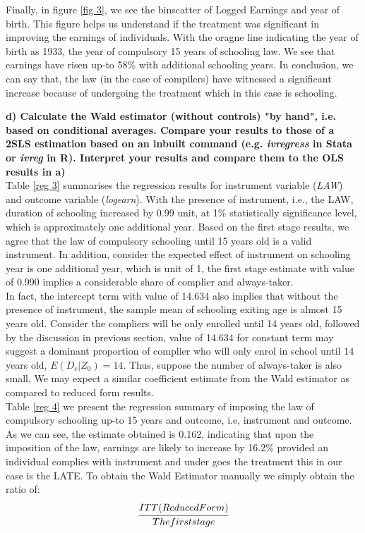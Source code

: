 \documentclass[a4paper,12pt,oneside,English]{article}
\begin{document}
Finally, in figure \ref{fig 3}, we see the binscatter of Logged Earnings and year of birth. This figure helps us understand if the treatment was significant in improving the earnings of individuals. With the oragne line indicating the year of birth as 1933, the year of compulsory 15 years of schooling law. We see that earnings have risen up-to 58\% with additional schooling years. In conclusion, we can say that, the law (in the case of compilers) have witnessed a significant increase because of undergoing the treatment which in this case is schooling.

\newpage
\textbf{d) Calculate the Wald estimator (without controls) "by hand", i.e. based on conditional averages. Compare your results to those of a 2SLS estimation based on an inbuilt command (e.g. \textit{ivregress} in Stata or \textit{ivreg} in R). Interpret your results and compare them to the OLS results in a)}\\

Table \ref{reg 3} summarises the regression results for instrument variable (\textit{LAW}) and outcome variable (\textit{logearn}). With the presence of instrument, i.e., the LAW, duration of schooling increased by 0.99 unit, at 1\% statistically significance level, which is approximately one additional year. Based on the first stage results, we agree that the law of compulsory schooling until 15 years old is a valid instrument. In addition, consider the expected effect of instrument on schooling year is one additional year, which is unit of 1, the first stage estimate with value of 0.990 implies a considerable share of complier and always-taker.\\
In fact, the intercept term with value of 14.634 also implies that without the presence of instrument, the sample mean of schooling exiting age is almost 15 years old. Consider the compliers will be only enrolled until 14 years old, followed by the discussion in previous section, value of 14.634 for constant term may suggest a dominant proportion of complier who will only enrol in school until 14 years old, $E(D_c|Z_0)=14$. Thus, suppose the number of always-taker is also small, We may expect a similar coefficient estimate from the Wald estimator as compared to reduced form results. \\ 

Table \ref{reg 4} we present the regression summary of imposing the law of compulsory schooling up-to 15 years and outcome, i.e, instrument and outcome. As we can see, the estimate obtained is 0.162, indicating that upon the imposition of the law, earnings are likely to increase by 16.2\% provided an individual complies with instrument and under goes the treatment this in our case is the LATE. To obtain the Wald Estimator manually we simply obtain the ratio of: 
\\
\begin{align*}
       \cfrac{ITT(Reduced Form)}{The first stage}
\end{align*}
 
\end{document}
